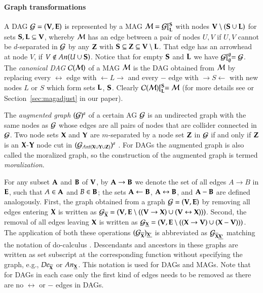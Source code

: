 \paragraph{Graph transformations} 
A DAG ${\cal G} = ({\bf V},{\bf E})$ is represented by a MAG ${\cal M} = {\cal G}[^{\bf S}_{\bf L}$  with nodes $ {\bf V} \setminus ({\bf S} \cup {\bf L}) $ for sets ${\bf S},{\bf L}\subseteq{\bf V}$, whereby $ {\cal M} $ has an edge between a pair of nodes $U,V$  if $U,V$ cannot be $d$-separated in ${\cal G}$ by any ${\bf Z}$ with ${\bf S} \subseteq {\bf Z} \subseteq {\bf V}\setminus{\bf L}$. That edge has an arrowhead at node $ V $, if $V \notin \textit{An}(U \cup {\bf S})$.
Notice that for empty ${\bf S}$ and ${\bf L}$ we have ${\cal G}[_{\emptyset}^{\emptyset}={\cal G}$.
The \emph{canonical DAG} ${\cal C}({\cal M})$ of a MAG ${\cal M}$ is the DAG obtained from ${\cal M}$ by replacing every $\leftrightarrow$ edge with $\gets L \to$ and every $-$ edge with $\to S \gets$ with new nodes $L$ or $ S $ which form sets ${\bf L}$, ${\bf S}$. Clearly ${\cal C}({\cal M})[^{\bf S}_{\bf L} = {\cal M}$ (for more details see \citep{Richardson2002} or Section~\ref{sec:magadjust} in our paper).


The \emph{augmented graph} $({\cal G})^a$ of a certain AG ${\cal G}$ is an undirected graph with the same nodes as ${\cal G}$ whose edges are all pairs of nodes that are collider connected in ${\cal G}$. Two node sets ${\bf X}$ and ${\bf Y}$ are $m$-separated by a node set ${\bf Z}$ in ${\cal G}$  if and only if ${\bf Z}$ is an ${\bf X}$-${\bf Y}$ node cut in $({\cal G}_{\textit{Ant}({\bf X}\cup{\bf Y}\cup{\bf Z})})^a$  \citep{Richardson2002}. For DAGs the augmented graph is also called the moralized graph, so the construction of the augmented graph is termed \emph{moralization}. 

For any subset ${\bf A}$ and ${\bf B}$ of ${\bf V}$, by ${\bf A} \to {\bf B}$ we denote the set of 
all edges $A \to B$ in ${\bf E}$, such that $A \in {\bf A}$ and $B\in {\bf B}$; the sets ${\bf A} \gets  {\bf B}$, 
${\bf A} \leftrightarrow  {\bf B}$, and ${\bf A} -  {\bf B}$ are defined analogously.
First, the graph obtained from a graph $ {\cal G} = ({\bf V},{\bf E}) $ by removing all edges entering ${\bf X}$ is written as $ {\cal G}_{\overline{{\bf X}}} = ({\bf V}, {\bf E} \setminus (( {\bf V} \to {\bf X} ) \cup ( {\bf V} \leftrightarrow {\bf X} ) )) $. Second, the removal of all edges leaving $ {\bf X} $ is written as 
$ {\cal G}_{\underline{{\bf X}}} = ({\bf V}, {\bf E} \setminus (( {\bf X} \to {\bf V} ) \cup( {\bf X} - {\bf V} ) )) $. The application of both these operations $ ({\cal G}_{\overline{{\bf X}}})_{\underline{{\bf X}'}} $  is abbreviated as $ {\cal G}_{\overline{{\bf X}}\underline{{\bf X}'}} $ matching the notation of do-calculus \cite{Pearl2009}. Descendants and ancestors in these graphs are written as set subscript at the  corresponding function without specifying the graph, e.g., $ \textit{De}_{\overline{{\bf X}}} $ or $ \textit{An}_{\underline{{\bf X}}} $. This notation is used for DAGs and MAGs.
Note that for DAGs in each case only the first kind of edges needs to be removed as there are no $\leftrightarrow$ or $-$ edges in DAGs.  



